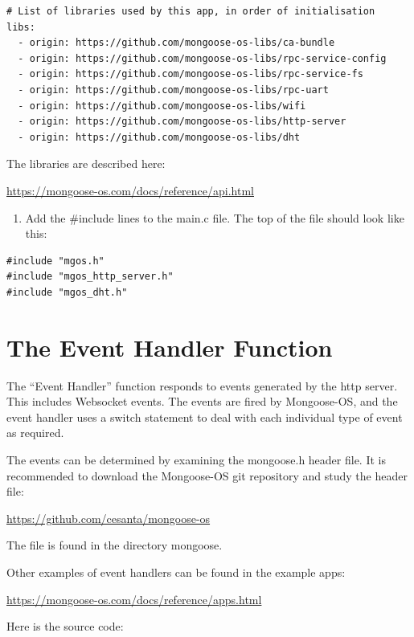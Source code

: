\documentclass[oneside,letterpaper,12pt]{book}
\providecommand{\tightlist}{%
  \setlength{\itemsep}{0pt}\setlength{\parskip}{0pt}}
\begin{document}
\begin{verbatim}
# List of libraries used by this app, in order of initialisation
libs:
  - origin: https://github.com/mongoose-os-libs/ca-bundle
  - origin: https://github.com/mongoose-os-libs/rpc-service-config
  - origin: https://github.com/mongoose-os-libs/rpc-service-fs
  - origin: https://github.com/mongoose-os-libs/rpc-uart
  - origin: https://github.com/mongoose-os-libs/wifi
  - origin: https://github.com/mongoose-os-libs/http-server
  - origin: https://github.com/mongoose-os-libs/dht
\end{verbatim}

The libraries are described here:

\url{https://mongoose-os.com/docs/reference/api.html}

\begin{enumerate}
\def\labelenumi{\arabic{enumi}.}
\setcounter{enumi}{1}
\tightlist
\item
  Add the \#include lines to the main.c file. The top of the file should
  look like this:
\end{enumerate}

\begin{verbatim}
#include "mgos.h"
#include "mgos_http_server.h"
#include "mgos_dht.h"
\end{verbatim}

\section{The Event Handler Function}\label{the-event-handler-function}

The ``Event Handler'' function responds to events generated by the http
server. This includes Websocket events. The events are fired by
Mongoose-OS, and the event handler uses a switch statement to deal with
each individual type of event as required.

The events can be determined by examining the mongoose.h header file. It
is recommended to download the Mongoose-OS git repository and study the
header file:

\url{https://github.com/cesanta/mongoose-os}

The file is found in the directory mongoose.

Other examples of event handlers can be found in the example apps:

\url{https://mongoose-os.com/docs/reference/apps.html}

Here is the source code:
\end{document}
